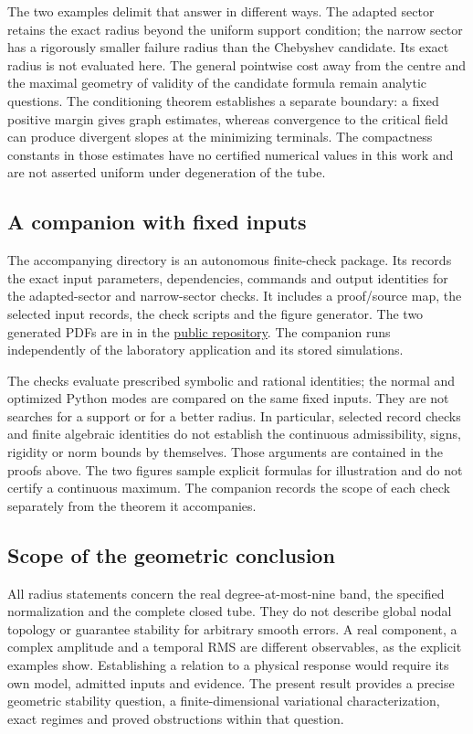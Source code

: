 \documentclass[11pt,a4paper]{article}
\begin{document}
The two examples delimit that answer in different ways. The adapted
sector retains the exact radius beyond the uniform support condition;
the narrow sector has a rigorously smaller failure radius than the
Chebyshev candidate. Its exact radius is not evaluated here. The general
pointwise cost away from the centre and the maximal geometry of validity
of the candidate formula remain analytic questions. The conditioning
theorem establishes a separate boundary: a fixed positive margin gives
graph estimates, whereas convergence to the critical field can produce
divergent slopes at the minimizing terminals. The compactness constants
in those estimates have no certified numerical values in this work and
are not asserted uniform under degeneration of the tube.

\subsection{A companion with fixed inputs}
The accompanying directory  is an autonomous finite-check
package. Its  records the exact input parameters,
dependencies, commands and output identities for the adapted-sector and
narrow-sector checks. It includes a proof/source map, the selected input
records, the check scripts and the figure generator. The two generated
PDFs are in  in the
\href{https://github.com/aconsciousfractal/B3-Nodal-Stability-Radii}{public repository}.
The companion runs independently of the laboratory application and its
stored simulations.

The checks evaluate prescribed symbolic and rational identities; the
normal and optimized Python modes are compared on the same fixed inputs.
They are not searches for a support or for a better radius. In particular,
selected record checks and finite algebraic identities do not establish
the continuous admissibility, signs, rigidity or norm bounds by themselves.
Those arguments are contained in the proofs above. The two figures sample
explicit formulas for illustration and do not certify a continuous maximum.
The companion records the scope of each check separately from the theorem
it accompanies.

\subsection{Scope of the geometric conclusion}
All radius statements concern the real degree-at-most-nine band, the
specified normalization and the complete closed tube. They do not
describe global nodal topology or guarantee stability for arbitrary
smooth errors. A real component, a complex amplitude and a temporal RMS
are different observables, as the explicit examples show. Establishing
a relation to a physical response would require its own model, admitted
inputs and evidence. The present result provides a precise geometric
stability question, a finite-dimensional variational characterization, exact regimes and
proved obstructions within that question.
\end{document}
